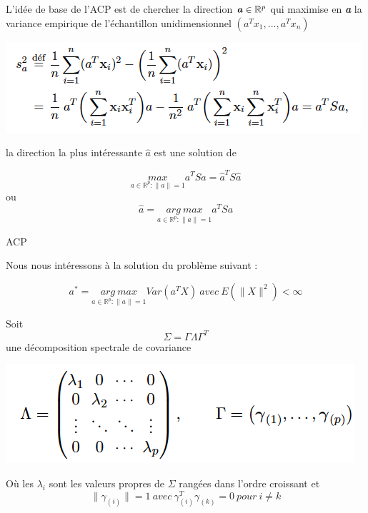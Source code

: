 \documentclass[12pt]{beamer}
\begin{document}
\begin{frame}{}

L’idée de base de l’ACP est de chercher la direction  $\textbf{\textit{a}} \in \mathbb{R}^p$ qui maximise en \textit{\textbf{a}} la variance empirique de l’échantillon unidimensionnel $(a^T x_1, . . . ,a^T x_n)$


\centering
\includegraphics[scale=0.6]{Sa.png} 

la direction la plus intéressante $\hat{a}$ est une solution de 

$$\underset{a \in \mathbb{R}^p : \parallel a \parallel=1}{max}    a^TSa=\hat{a}^TS\hat{a} $$
ou 
$$ \hat{a}=\underset{a \in \mathbb{R}^p : \parallel a \parallel=1}{arg \ max} a^T Sa $$

\end{frame}

\begin{frame}{ACP}

Nous nous intéressons à la solution du problème suivant : 

$$ a^*=\underset{a \in \mathbb{R}^p : \parallel a \parallel=1}{arg \ max} Var (a^TX) \ avec \  E(\parallel X \parallel^2)<\infty$$

Soit $$ \Sigma =\Gamma \Lambda \Gamma^T $$ une décomposition spectrale de covariance 
 
\centering
\includegraphics[scale=.4]{Decomp.png} 

Où les $\lambda_i$ sont les valeurs propres de $\Sigma$ rangées dans l'ordre croissant et  $$ \parallel \gamma_{(i)}  \parallel=1    \  avec \   \gamma_{(i)}^T \gamma_{(k)}=0 \  pour \  i \neq k $$ 

\end{frame}
\end{document}
